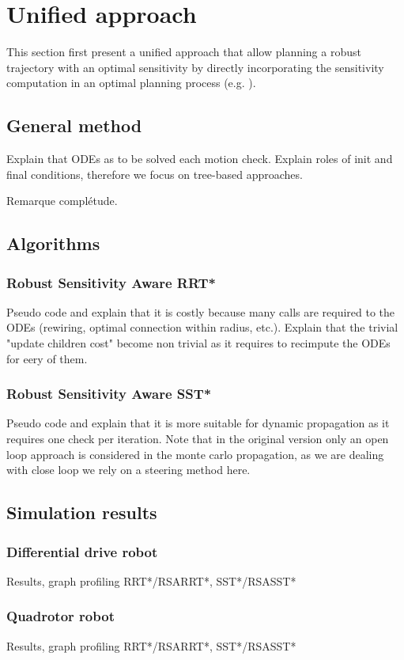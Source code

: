\section{Unified approach}\label{sec:unified}

This section first present a unified approach that allow planning a robust trajectory with an optimal sensitivity by directly incorporating the sensitivity computation in an optimal planning process (e.g. ).

\subsection{General method}
Explain that ODEs as to be solved each motion check.
Explain roles of init and final conditions, therefore we focus on tree-based approaches.

Remarque complétude.

\subsection{Algorithms}
\subsubsection{Robust Sensitivity Aware RRT*}
Pseudo code and explain that it is costly because many calls are required to the ODEs (rewiring, optimal connection within radius, etc.).
Explain that the trivial "update children cost" become non trivial as it requires to recimpute the ODEs for eery of them.
\subsubsection{Robust Sensitivity Aware SST*}
Pseudo code and explain that it is more suitable for dynamic propagation as it requires one check per iteration.
Note that in the original version only an open loop approach is considered in the monte carlo propagation, as we are dealing with close loop we rely on a steering method here.

\subsection{Simulation results}
\subsubsection{Differential drive robot}
Results, graph profiling RRT*/RSARRT*, SST*/RSASST*
\subsubsection{Quadrotor robot}
Results, graph profiling RRT*/RSARRT*, SST*/RSASST*


